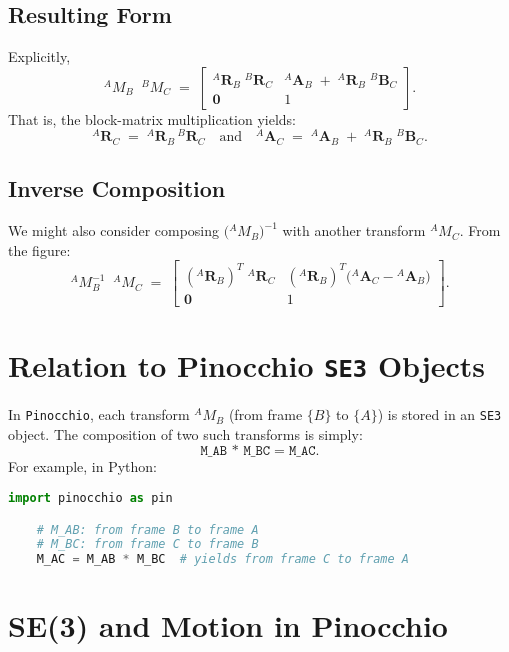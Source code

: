 \documentclass[10pt]{article}
\begin{document}
\subsection*{Resulting Form}
Explicitly, 
\[
{}^{A}\!M_{B} \;\; {}^{B}\!M_{C}
\;=\;
\begin{bmatrix}
{}^{A}\mathbf{R}_{B}\;{}^{B}\mathbf{R}_{C}
& 
{}^{A}\mathbf{A}_{B} \;+\; {}^{A}\mathbf{R}_{B}\; {}^{B}\mathbf{B}_{C}
\\[6pt]
\mathbf{0} & 1
\end{bmatrix}.
\]
That is, the block-matrix multiplication yields:
\[
{}^{A}\mathbf{R}_{C}
\;=\;
{}^{A}\mathbf{R}_{B}\,{}^{B}\mathbf{R}_{C}
\quad\text{and}\quad
{}^{A}\mathbf{A}_{C}
\;=\;
{}^{A}\mathbf{A}_{B} \;+\; {}^{A}\mathbf{R}_{B}\; {}^{B}\mathbf{B}_{C}.
\]

\subsection*{Inverse Composition}
We might also consider composing \(\bigl({}^{A}\!M_{B}\bigr)^{-1}\) with another transform \({}^{A}\!M_{C}\).  From the figure:
\[
{}^{A}\!M_{B}^{-1}\;\;{}^{A}\!M_{C}
\;=\;
\begin{bmatrix}
({}^{A}\mathbf{R}_{B})^{T}\;{}^{A}\mathbf{R}_{C}
&
({}^{A}\mathbf{R}_{B})^{T}\bigl({}^{A}\mathbf{A}_{C} - {}^{A}\mathbf{A}_{B}\bigr)
\\[4pt]
\mathbf{0} & 1
\end{bmatrix}.
\]

\section*{Relation to Pinocchio \texttt{SE3} Objects}
In \texttt{Pinocchio}, each transform \({}^{A}\!M_{B}\) (from frame \(\{B\}\) to \(\{A\}\)) is stored in an \texttt{SE3} object.  The composition of two such transforms is simply:
\[
\texttt{M\_AB * M\_BC} = \texttt{M\_AC}.
\]
For example, in Python:
\begin{lstlisting}[language=Python]
    import pinocchio as pin

    # M_AB: from frame B to frame A
    # M_BC: from frame C to frame B
    M_AC = M_AB * M_BC  # yields from frame C to frame A
\end{lstlisting}





\section*{SE(3) and Motion in Pinocchio}
\end{document}
